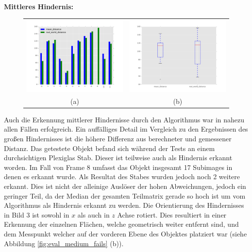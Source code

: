 	\noindent
	\textbf{Mittleres Hindernis:}\\
	\begin{figure}[h]
		\centering
		\begin{tabular}{cc}
		\includegraphics[width=7cm]{img/evaluation/sub_medium_bar}&
		\includegraphics[width=7cm]{img/evaluation/sub_medium_box}\\
		(a) &  (b)
		\end{tabular}
	    \caption{}
	    \label{fig:eval_medium}
	\end{figure}
	
	\noindent

	Auch die Erkennung mittlerer Hindernisse durch den Algorithmus war in nahezu allen Fällen erfolgreich. Ein auffälliges Detail im Vergleich zu den Ergebnissen des großen Hindernisses ist die höhere Differenz aus berechneter und gemessener Distanz. Das getestete Objekt befand sich während der Tests an einem durchsichtigen Plexiglas Stab. Dieser ist teilweise auch als Hindernis erkannt worden. Im Fall von Frame 8 umfasst das Objekt insgesamt 17 Subimages in denen es erkannt wurde. Als Resultat des Stabes wurden jedoch noch 2 weitere erkannt.
	Dies ist nicht der alleinige Auslöser der hohen Abweichungen, jedoch ein geringer Teil, da der Median der gesamten Teilmatrix gerade so hoch ist um vom Algorithmus als Hindernis erkannt zu werden. Die Orientierung des Hindernisses in Bild 3 ist sowohl in $x$ als auch in $z$ Achse rotiert. Dies resultiert in einer Erkennung der einzelnen Flächen, welche geometrisch weiter entfernt sind, und dem Messpunkt welcher auf der vorderen Ebene des Objektes platziert war (siehe Abbildung \ref{fig:eval_medium_fails} (b)). 
	

